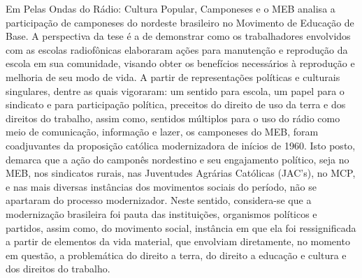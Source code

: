 Em Pelas Ondas do Rádio: Cultura Popular, Camponeses e o MEB analisa a participação de camponeses do nordeste brasileiro no Movimento de Educação de Base. A perspectiva da tese é a de demonstrar como os trabalhadores envolvidos com as escolas radiofônicas elaboraram ações para manutenção e reprodução da escola em sua comunidade, visando obter os benefícios necessários à reprodução e melhoria de seu modo de vida. A partir de representações políticas e culturais singulares, dentre as quais vigoraram: um sentido para escola, um papel para o sindicato e para participação política, preceitos do direito de uso da terra e dos direitos do trabalho, assim como, sentidos múltiplos para o uso do rádio como meio de comunicação, informação e lazer, os camponeses do MEB, foram coadjuvantes da proposição católica modernizadora de inícios de 1960. Isto posto, demarca que a ação do camponês nordestino e seu engajamento político, seja no MEB, nos sindicatos rurais, nas Juventudes Agrárias Católicas (JAC’s), no MCP, e nas mais diversas instâncias dos movimentos sociais do período, não se apartaram do processo modernizador. Neste sentido, considera-se que a modernização brasileira foi pauta das instituições, organismos políticos e partidos, assim como, do movimento social, instância em que ela foi ressignificada a partir de elementos da vida material, que envolviam diretamente, no momento em questão, a problemática do direito a terra, do direito a educação e cultura e dos direitos do trabalho.

